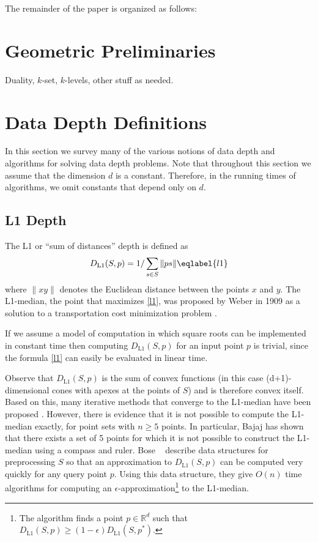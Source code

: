 \documentclass[lotsofwhite,charterfonts]{patmorin}
\newcommand{\DLO}{D_\mathrm{L1}}
\begin{document}
The remainder of the paper is organized as follows:

\section{Geometric Preliminaries}

Duality, $k$-set, $k$-levels, other stuff as needed.

\section{Data Depth Definitions}

In this section we survey many of the various notions of data depth
and algorithms for solving data depth problems.   Note that throughout
this section we assume that the dimension $d$ is a constant.
Therefore, in the running times of algorithms, we omit constants that
depend only on $d$.

\subsection{L1 Depth}

The L1 or ``sum of distances'' depth is defined as
\begin{equation}
   \DLO(S,p) = 1/\sum_{s\in S} \|ps\|  \eqlabel{l1}
\end{equation}
where $\|xy\|$ denotes the Euclidean distance between the points $x$
and $y$.  The L1-median, the point that maximizes \eqref{l1}, was
proposed by Weber in 1909 as a solution to a transportation cost
minimization problem \cite{web1909}.

If we assume a model of computation in which square roots can be
implemented in constant time then computing $\DLO(S,p)$ for an input
point $p$ is trivial, since the formula \eqref{l1} can easily be
evaluated in linear time.

Observe that $\DLO(S,p)$ is the sum of convex functions (in this case
(d+1)-dimensional cones with apexes at the points of $S$) and is
therefore convex itself.  Based on this, many iterative methods that
converge to the L1-median have been proposed \cite{X,X,X,X}.  However,
there is evidence that it is not possible to compute the L1-median
exactly, for point sets with $n\ge 5$ points.  In particular, Bajaj
\cite{bXX} has shown that there exists a set of 5 points for which it
is not possible to construct the L1-median using a compass and ruler.
Bose \etal\ \cite{bmm01,bdm02} describe data structures for
preprocessing $S$ so that an approximation to $\DLO(S,p)$ can be
computed very quickly for any query point $p$.  Using this data
structure, they give $O(n)$ time algorithms for computing an
$\epsilon$-approximation\footnote{The algorithm finds a point
$p\in\mathbb{R}^d$ such that $\DLO(S,p)\ge (1-\epsilon)\DLO(S,p^*)$.} to
the L1-median.
\end{document}
